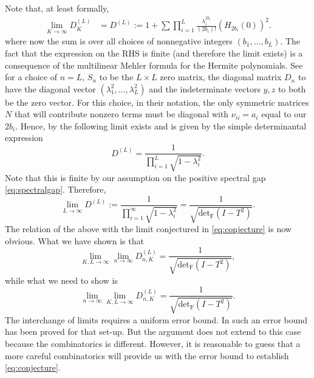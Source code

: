 \documentclass{amsart}
\newcommand{\Fdet}{\mathrm{det}_{\mathrm{F}}}
\begin{document}
Note that, at least formally, 
\[
\begin{split}
\lim_{K\rightarrow \infty} D_K^{(L)}&=D^{(L)}:=1 +  \sum \prod_{i=1}^L \frac{ \lambda_{i}^{2b_i}}{(2b_i)!} \left( H_{2 b_i}(0)\right)^2.
\end{split}
\]
where now the sum is over all choices of nonnegative integers $(b_1, \ldots, b_L)$. The fact that the expression on the RHS is finite (and therefore the limit exists) is a consequence of the  multilinear Mehler formula for the Hermite polynomials. See \cite[eqn. (2.4)]{Foata81} for a choice of $n=L$, $S_n$ to be the $L\times L$ zero matrix, the diagonal matrix $D_n$ to have the diagonal vector $(\lambda^2_1, \ldots, \lambda^2_L)$ and the indeterminate vectors $y,z$ to both be the zero vector. For this choice, in their notation, the only symmetric matrices $N$ that will contribute nonzero terms must be diagonal with $\nu_{ii}=a_i$ equal to our $2b_i$. Hence, by \cite[eqn. (2.4)]{Foata81} the following limit exists and is given by the simple determinantal expression
\[
D^{(L)}=\frac{1}{\prod_{i=1}^L\sqrt{1-\lambda^2_i}}.
\]
Note that this is finite by our assumption on the positive spectral gap \eqref{eq:spectralgap}. Therefore, 
\[
\lim_{L\rightarrow \infty} D^{(L)}:= \frac{1}{\prod_{i=1}^\infty\sqrt{1-\lambda^2_i}}=\frac{1}{\sqrt{\Fdet\left(I - T^2\right)}}.
\]
The relation of the above with the limit conjectured in \eqref{eq:conjecture} is now obvious. What we have shown is that 
\[
\lim_{K,L\rightarrow \infty} \lim_{n\rightarrow \infty} D^{(L)}_{n,K}= \frac{1}{\sqrt{\Fdet\left(I - T^2\right)}},
\]
while what we need to show is 
\[
\lim_{n\rightarrow \infty} \lim_{K,L\rightarrow \infty}  D^{(L)}_{n,K}= \frac{1}{\sqrt{\Fdet\left(I - T^2\right)}}.
\]
The interchange of limits requires a uniform error bound. In \cite{HLP} such an error bound has been proved for that set-up. But the argument does not extend to this case because the combinatorics is different. However, it is reasonable to guess that a more careful combinatorics will provide us with the error bound to establish \eqref{eq:conjecture}.  
\end{document}
